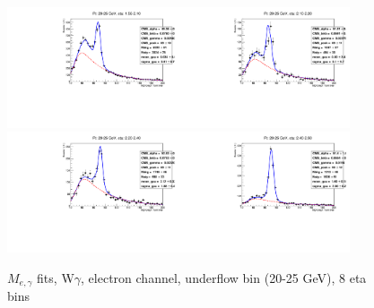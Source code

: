 \begin{figure}[htb]
\begin{center}
   \includegraphics[width=0.45\textwidth]{../figs/figs_v11/ELECTRON_WGamma/EtoGammaFits/sa_hZmass_h_Data_EtoGamma_Enr_ENDCAP_pt20to25_ieta0_noWMtCut.pdf}\includegraphics[width=0.45\textwidth]{../figs/figs_v11/ELECTRON_WGamma/EtoGammaFits/sa_hZmass_h_Data_EtoGamma_Enr_ENDCAP_pt20to25_ieta1_noWMtCut.pdf}\\
   \includegraphics[width=0.45\textwidth]{../figs/figs_v11/ELECTRON_WGamma/EtoGammaFits/sa_hZmass_h_Data_EtoGamma_Enr_ENDCAP_pt20to25_ieta2_noWMtCut.pdf}\includegraphics[width=0.45\textwidth]{../figs/figs_v11/ELECTRON_WGamma/EtoGammaFits/sa_hZmass_h_Data_EtoGamma_Enr_ENDCAP_pt20to25_ieta3_noWMtCut.pdf}\\
  \label{fig:etogFits_20to25}
  \caption{$M_{e,\gamma}$ fits, W$\gamma$, electron channel, underflow bin (20-25 GeV), 8 eta bins}
  \end{center}
\end{figure}

